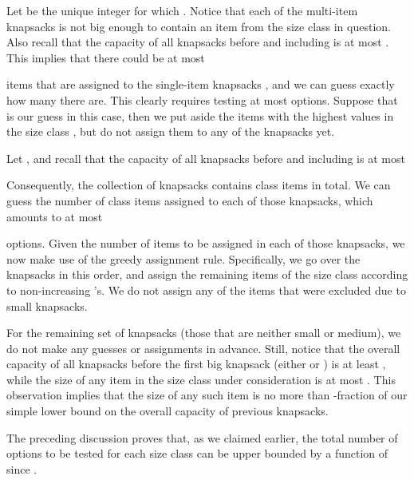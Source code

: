 \documentclass[11pt]{article}
\theoremstyle{plain}
\theoremstyle{definition}
\begin{document}
\smallskip {}
Let  be the unique integer for which . Notice that each of the multi-item knapsacks  is not big enough to contain an item from the size class in question. Also recall that the capacity of all knapsacks before and including  is at most . This implies that there could be at most

items that are assigned to the single-item knapsacks , and we can guess exactly how many there are. This clearly requires testing at most  options. Suppose that  is our guess in this case, then we put aside the  items with the highest  values in the size class , but do not assign them to any of the knapsacks yet.

\smallskip {}
Let , and recall that the capacity of all knapsacks before and including  is at most

Consequently, the collection of knapsacks  contains  class items in total. We can guess the number of class items assigned to each of those  knapsacks, which amounts to at most

options. Given the number of items to be assigned in each of those knapsacks, we now make use of the greedy assignment rule. Specifically, we go over the knapsacks  in this order, and assign the remaining items of the size class  according to non-increasing 's. We do not assign any of the  items that were excluded due to small knapsacks.

\smallskip {} For the remaining set of knapsacks (those that are neither small or medium), we do not make any guesses or assignments in advance. Still, notice that the overall capacity of all knapsacks before the first big knapsack (either  or ) is at least , while the size of any item in the size class under consideration is at most . This observation implies that the size of any such item is no more than -fraction of our simple lower bound on the overall capacity of previous knapsacks.

\smallskip The preceding discussion proves that, as we claimed earlier, the total number of options  to be tested for each size class can be upper bounded by a function of  since .
\end{document}

